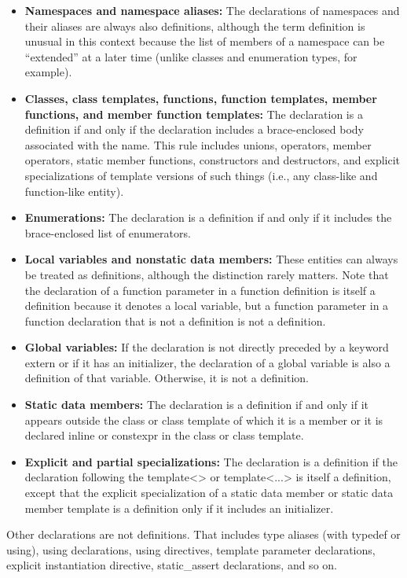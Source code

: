 \begin{itemize}
\item 
\textbf{Namespaces and namespace aliases: }
The declarations of namespaces and their aliases are always also definitions, although the term definition is unusual in this context because the list of members of a namespace can be “extended” at a later time (unlike classes and enumeration types, for example).

\item 
\textbf{Classes, class templates, functions, function templates, member functions, and member function templates: }
The declaration is a definition if and only if the declaration includes a brace-enclosed body associated with the name. This rule includes unions, operators, member operators, static member functions, constructors and destructors, and explicit specializations of template versions of such things (i.e., any class-like and function-like entity).

\item 
\textbf{Enumerations:}
The declaration is a definition if and only if it includes the brace-enclosed list of enumerators.

\item 
\textbf{Local variables and nonstatic data members:}
These entities can always be treated as definitions, although the distinction rarely matters. Note that the declaration of a function parameter in a function definition is itself a definition because it denotes a local variable, but a function parameter in a function declaration that is not a definition is not a  definition.

\item 
\textbf{Global variables:}
If the declaration is not directly preceded by a keyword extern or if it has an initializer, the declaration of a global variable is also a definition of that variable. Otherwise, it is not a definition.

\item 
\textbf{Static data members: }
The declaration is a definition if and only if it appears outside the class or class template of which it is a member or it is declared inline or constexpr in the class or class template.

\item 
\textbf{Explicit and partial specializations:}
The declaration is a definition if the declaration following the template<> or template<...> is itself a definition, except that the explicit specialization of a static data member or static data member template is a definition only if it includes an initializer.

\end{itemize}

Other declarations are not definitions. That includes type aliases (with typedef or using), using declarations, using directives, template parameter declarations, explicit instantiation directive, static\_assert declarations, and so on.






